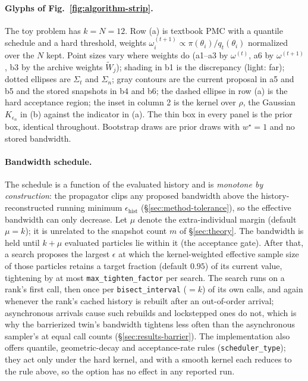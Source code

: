 \documentclass[10pt]{article}
\theoremstyle{plain}
\theoremstyle{definition}
\begin{document}
\paragraph{Glyphs of Fig.~\ref{fig:algorithm-strip}.} The toy problem has $k=N=12$. Row (a) is textbook PMC with a quantile schedule and a hard threshold, weights $\omega^{(t+1)}_i\propto\pi(\theta_i)/q_t(\theta_i)$ normalized over the $N$ kept. Point sizes vary where weights do (a1--a3 by $\omega^{(t)}$, a6 by $\omega^{(t+1)}$, b3 by the archive weights $\tilde W_j$); shading in b1 is the discrepancy (light: far); dotted ellipses are $\Sigma_t$ and $\Sigma_n$; gray contours are the current proposal in a5 and b5 and the stored snapshots in b4 and b6; the dashed ellipse in row (a) is the hard acceptance region; the inset in column 2 is the kernel over $\rho$, the Gaussian $K_{\epsilon_n}$ in (b) against the indicator in (a). The thin box in every panel is the prior box, identical throughout. Bootstrap draws are prior draws with $w^\star=1$ and no stored bandwidth.

\paragraph{Bandwidth schedule.} The schedule is a function of the evaluated history and is \emph{monotone by construction}: the propagator clips any proposed bandwidth above the history-reconstructed running minimum $\epsilon_{\text{hist}}$ (\S\ref{sec:method-tolerance}), so the effective bandwidth can only decrease. Let $\mu$ denote the extra-individual margin (default $\mu=k$); it is unrelated to the snapshot count $m$ of \S\ref{sec:theory}. The bandwidth is held until $k+\mu$ evaluated particles lie within it (the acceptance gate). After that, a search proposes the largest $\epsilon$ at which the kernel-weighted effective sample size of those particles retains a target fraction (default $0.95$) of its current value, tightening by at most \texttt{max\_tighten\_factor} per search. The search runs on a rank's first call, then once per \texttt{bisect\_interval} ($=k$) of its own calls, and again whenever the rank's cached history is rebuilt after an out-of-order arrival; asynchronous arrivals cause such rebuilds and lockstepped ones do not, which is why the barrierized twin's bandwidth tightens less often than the asynchronous sampler's at equal call counts (\S\ref{sec:results-barrier}). The implementation also offers quantile, geometric-decay and acceptance-rate rules (\texttt{scheduler\_type}); they act only under the hard kernel, and with a smooth kernel each reduces to the rule above, so the option has no effect in any reported run.
\end{document}
